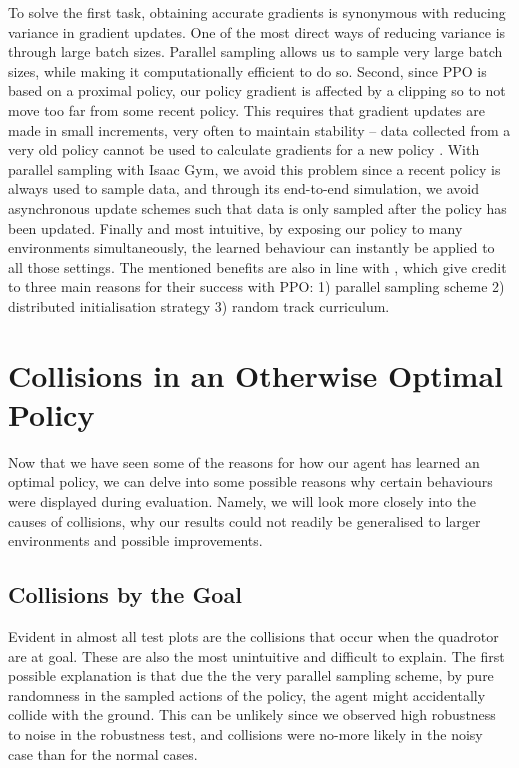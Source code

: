 To solve the first task, obtaining accurate gradients is synonymous with reducing variance in gradient updates. One of the most direct ways of reducing variance is through large batch sizes. Parallel sampling allows us to sample very large batch sizes, while making it computationally efficient to do so.
Second, since PPO is based on a proximal policy, our policy gradient is affected by a clipping so to not move too far from some recent policy. This requires that gradient updates are made in small increments, very often to maintain stability -- data collected from a very old policy cannot be used to calculate gradients for a new policy \cite{batchsizeInvariance}. With parallel sampling with Isaac Gym, we avoid this problem since a recent policy is always used to sample data, and through its end-to-end simulation, we avoid asynchronous update schemes such that data is only sampled after the policy has been updated.
Finally and most intuitive, by exposing our policy to many environments simultaneously, the learned behaviour can instantly be applied to all those settings. 
The mentioned benefits are also in line with \cite{song2021droneRacing}, which give credit to three main reasons for their success with PPO: 1) parallel sampling scheme 2) distributed initialisation strategy 3) random track curriculum. 



\section{Collisions in an Otherwise Optimal Policy}
Now that we have seen some of the reasons for how our agent has learned an optimal policy, we can delve into some possible reasons why certain behaviours were displayed during evaluation. Namely, we will look more closely into the causes of collisions, why our results could not readily be generalised to larger environments and possible improvements.


\subsection{Collisions by the Goal}
Evident in almost all test plots are the collisions that occur when the quadrotor are at goal. These are also the most unintuitive and difficult to explain. The first possible explanation is that due the the very parallel sampling scheme, by pure randomness in the sampled actions of the policy, the agent might accidentally collide with the ground. This can be unlikely since we observed high robustness to noise in the robustness test, and collisions were no-more likely in the noisy case than for the normal cases.

